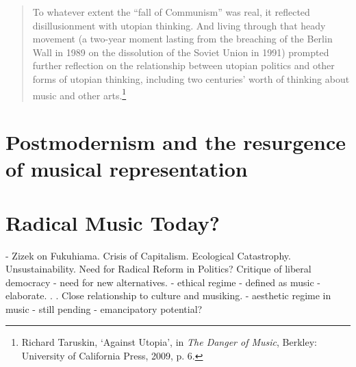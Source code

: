 \begin{quote}
To whatever extent the ``fall of Communism'' was real, it reflected disillusionment with utopian thinking. And living through that heady movement (a two-year moment lasting from the breaching of the Berlin Wall in 1989 on the dissolution of the Soviet Union in 1991) prompted further reflection on the relationship between utopian politics and other forms of utopian thinking, including two centuries' worth of thinking about music and other arts.\footnote{Richard Taruskin, `Against Utopia', in \emph{The Danger of Music}, Berkley: University of California Press, 2009, p. 6.}
\end{quote}


\section{Postmodernism and the resurgence of musical representation}

\section{Radical Music Today?}

- Zizek on Fukuhiama. Crisis of Capitalism. Ecological Catastrophy. Unsustainability. Need for Radical Reform in Politics? Critique of liberal democracy - need for new alternatives.
- ethical regime - defined as music - elaborate. . . Close relationship to culture and musiking.
- aesthetic regime in music - still pending - emancipatory potential?


\label{ch:introduction}